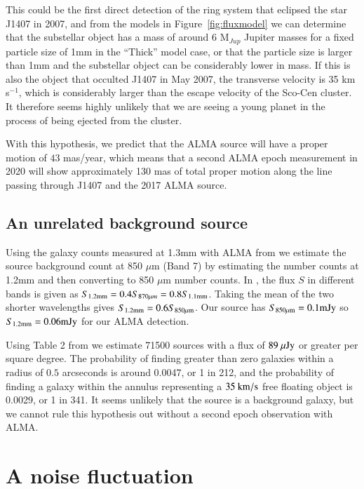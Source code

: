 \documentclass[twocolumn]{aa} %
\newcommand{\kms}{km s$^{-1}$}
\begin{document}
This could be the first direct detection of the ring system that eclipsed the star J1407 in 2007, and from the models in Figure~\ref{fig:fluxmodel} we can determine that the substellar object has a mass of around 6 M$_{Jup}$ Jupiter masses for a fixed particle size of 1mm in the ``Thick'' model case, or that the particle size is larger than 1mm and the substellar object can be considerably lower in mass.
%
If this is also the object that occulted J1407 in May 2007, the transverse velocity is 35 \kms{}, which is considerably larger than the escape velocity of the Sco-Cen cluster.
%
It therefore seems highly unlikely that we are seeing a young planet in the process of being ejected from the cluster.

With this hypothesis, we predict that the ALMA source will have a proper motion of $43$ mas/year, which means that a second ALMA epoch measurement in 2020 will show approximately 130 mas of total proper motion along the line passing through J1407 and the 2017 ALMA source.

\subsection{An unrelated background source} %

Using the galaxy counts measured at 1.3mm with ALMA from \citet{Aravena16} we estimate the source background count at 850 $\mu$m (Band 7) by estimating the number counts at 1.2mm and then converting to 850 $\mu$m number counts.
%
In \citeauthor{Aravena16}, the flux $S$ in different bands is given as $S_{1.2\rm{mm}}=0.4S_{870\mu m}=0.8S_{1.1\rm{mm}}$.
%
Taking the mean of the two shorter wavelengths gives $S_{1.2\rm{mm}}=0.6S_{\rm 850\mu m}$.
% 
Our source has $S_{\rm 850\mu m} =0.1{\rm mJy}$ so $S_{1.2\rm{mm}}=0.06 {\rm mJy}$ for our ALMA detection.

Using Table 2 from \citet{Aravena16} we estimate 71500 sources with a flux of $89\rm{~\mu Jy}$ or greater per square degree.
%
The probability of finding greater than zero galaxies within a radius of $0.5$ arcseconds is around 0.0047, or 1 in 212, and the probability of finding a galaxy within the annulus representing a $35\rm{~km/s}$ free floating object is 0.0029, or 1 in 341.
%
It seems unlikely that the source is a background galaxy, but we cannot rule this hypothesis out without a second epoch observation with ALMA.

\section{A noise fluctuation}
\end{document}
